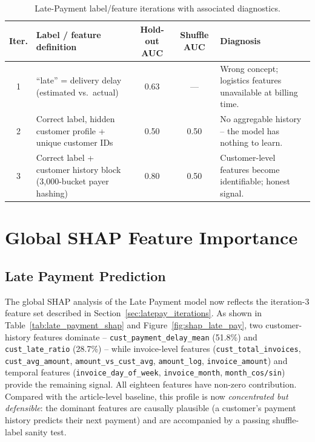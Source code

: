\documentclass[12pt,a4paper]{report}
\begin{document}
\begin{table}[H]
\centering
\caption{Late-Payment label/feature iterations with associated diagnostics.}
\label{tab:latepay_iters}
\begin{tabularx}{\textwidth}{c >{\raggedright\arraybackslash}X c c >{\raggedright\arraybackslash}X}
\toprule
\textbf{Iter.} & \textbf{Label / feature definition} & \textbf{Hold-out AUC} & \textbf{Shuffle AUC} & \textbf{Diagnosis} \\
\midrule
1 & ``late'' = delivery delay (estimated vs.\ actual) & 0.63 & --- & Wrong concept; logistics features unavailable at billing time. \\
2 & Correct label, hidden customer profile + unique customer IDs & 0.50 & 0.50 & No aggregable history -- the model has nothing to learn. \\
3 & Correct label + customer history block (3{,}000-bucket payer hashing) & 0.80 & 0.50 & Customer-level features become identifiable; honest signal. \\
\bottomrule
\end{tabularx}
\end{table}

\section{Global SHAP Feature Importance}
\label{sec:global_shap}

\subsection{Late Payment Prediction}

The global SHAP analysis of the Late Payment model now reflects the iteration-3 feature set described in Section~\ref{sec:latepay_iterations}. As shown in Table~\ref{tab:late_payment_shap} and Figure~\ref{fig:shap_late_pay}, two customer-history features dominate -- \texttt{cust\_payment\_delay\_mean} (51.8\%) and \texttt{cust\_late\_ratio} (28.7\%) -- while invoice-level features (\texttt{cust\_total\_invoices}, \texttt{cust\_avg\_amount}, \texttt{amount\_vs\_cust\_avg}, \texttt{amount\_log}, \texttt{invoice\_amount}) and temporal features (\texttt{invoice\_day\_of\_week}, \texttt{invoice\_month}, \texttt{month\_cos/sin}) provide the remaining signal. All eighteen features have non-zero contribution. Compared with the article-level baseline, this profile is now \emph{concentrated but defensible}: the dominant features are causally plausible (a customer's payment history predicts their next payment) and are accompanied by a passing shuffle-label sanity test.
\end{document}
